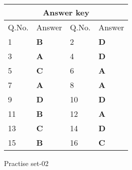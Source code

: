 \setlength\arrayrulewidth{1pt}
\begin{table}[H]
	\centering
	\begin{tabular}{|p{1.5cm}|p{1.5cm}||p{1.5cm}|p{1.5cm}|}
		\hline
		\multicolumn{4}{|c|}{\textbf{Answer key}}\\\hline\hline
		\rowcolor{ocrel}Q.No.&Answer&Q.No.&Answer\\\hline
		1&\textbf{B} &2&\textbf{D}\\\hline 
		3&\textbf{A} &4&\textbf{D} \\\hline
		5&\textbf{C} &6&\textbf{A} \\\hline
		7&\textbf{A}&8&\textbf{A}\\\hline
		9&\textbf{D}&10&\textbf{D}\\\hline
		11&\textbf{B} &12&\textbf{A}\\\hline
		13&\textbf{C}&14&\textbf{D}\\\hline
		15&\textbf{B}&16&\textbf{C}\\\hline
		
	\end{tabular}
\end{table}
\newpage
\begin{abox}
	Practise set-02
\end{abox}
